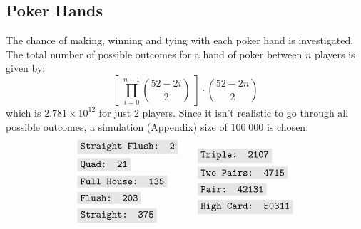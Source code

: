 \documentclass{article}
\newcommand{\code}[1]{\colorbox{codegray}{\texttt{#1}}}
\begin{document}
\subsection*{Poker Hands}

The chance of making, winning and tying with each poker hand is 
investigated. The total number of possible outcomes for a hand 
of poker between $n$ players is given by:
\[
    \left[ \; \prod_{i = 0}^{n - 1} \binom{52 - 2i}{2} \; \right] \cdot \binom{52 - 2n}{2}
\]
which is $2.781 \times 10^{12}$ for just 2 players. 
Since it isn't realistic to go through all possible outcomes,
a simulation (Appendix) size of $100 \; 000$ is chosen:
\begin{align*}
    \begin{split}
        & \code{Straight Flush: 2} \\
        & \code{Quad: 21} \\
        & \code{Full House: 135} \\
        & \code{Flush: 203} \\
        & \code{Straight: 375} \\
    \end{split}
    \qquad
    \begin{split}
        & \code{Triple: 2107} \\
        & \code{Two Pairs: 4715} \\
        & \code{Pair: 42131} \\
        & \code{High Card: 50311} 
    \end{split}
\end{align*}
\end{document}
